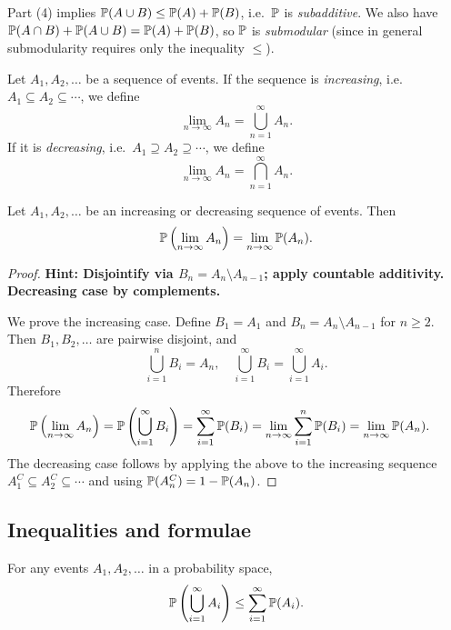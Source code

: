 \documentclass[a4paper]{article}
\begin{document}
\begin{remark}
  Part (4) implies $\P(A\cup B) \leq \P(A) + \P(B)$, i.e.\ $\P$ is \emph{subadditive}. We also have $\P(A\cap B) + \P(A \cup B) = \P(A) + \P(B)$, so $\P$ is \emph{submodular} (since in general submodularity requires only the inequality $\leq$).
\end{remark}

\begin{defi}
  Let $A_1, A_2, \dotsc$ be a sequence of events. If the sequence is \emph{increasing}, i.e.\ $A_1 \subseteq A_2 \subseteq \cdots$, we define
  \[
    \lim_{n\to \infty} A_n = \bigcup_{n=1}^\infty A_n.
  \]
  If it is \emph{decreasing}, i.e.\ $A_1\supseteq A_2 \supseteq \cdots$, we define
  \[
    \lim_{n\to \infty} A_n = \bigcap_{n=1}^\infty A_n.
  \]
\end{defi}

\begin{thm}
  Let $A_1, A_2, \dotsc$ be an increasing or decreasing sequence of events. Then
  \[
    \P\left(\lim_{n\to \infty} A_n\right) = \lim_{n\to \infty} \P(A_n).
  \]
\end{thm}

\begin{proof}
  \textbf{Hint: Disjointify via $B_n = A_n \setminus A_{n-1}$; apply countable additivity. Decreasing case by complements.}

  We prove the increasing case. Define $B_1 = A_1$ and $B_n = A_n \setminus A_{n-1}$ for $n \geq 2$. Then $B_1, B_2, \dotsc$ are pairwise disjoint, and
  \[
    \bigcup_{i=1}^n B_i = A_n, \quad \bigcup_{i=1}^\infty B_i = \bigcup_{i=1}^\infty A_i.
  \]
  Therefore
  \begin{align*}
    \P\left(\lim_{n \to \infty} A_n\right) &= \P\left(\bigcup_{i=1}^\infty B_i\right) = \sum_{i=1}^\infty \P(B_i) = \lim_{n \to \infty}\sum_{i = 1}^n \P(B_i) = \lim_{n \to \infty} \P(A_n).
  \end{align*}
  The decreasing case follows by applying the above to the increasing sequence $A_1^C \subseteq A_2^C \subseteq \cdots$ and using $\P(A_n^C) = 1 - \P(A_n)$.
\end{proof}

\subsection{Inequalities and formulae}

\begin{thm}
  For any events $A_1, A_2, \dotsc$ in a probability space,
  \[
    \P\left(\bigcup_{i = 1}^\infty A_i\right) \leq \sum_{i = 1}^\infty \P(A_i).
  \]
\end{thm}
\end{document}
